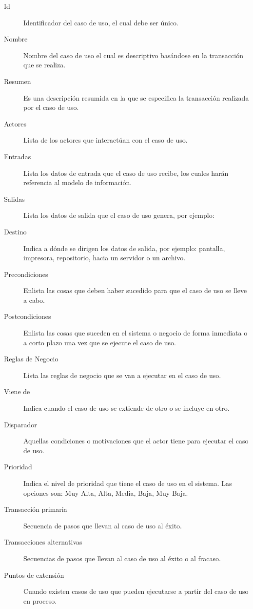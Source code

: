 \begin{description}
	\item[Id] Identificador del caso de uso, el cual debe ser único.
	\item[Nombre] Nombre del caso de uso el cual es descriptivo basándose en la transacción que se realiza.
	\item[Resumen] Es una descripción resumida en la que se especifica la transacción realizada por el caso de uso.
	\item[Actores] Lista de los actores que interactúan con el caso de uso.
	\item[Entradas] Lista los datos de entrada que el caso de uso recibe, los cuales harán referencia al modelo de información.
	\item[Salidas] Lista los datos de salida que el caso de uso genera, por ejemplo: 
	\item[Destino] Indica a dónde se dirigen los datos de salida, por ejemplo: pantalla, impresora, repositorio, hacia un servidor o un archivo.
	\item[Precondiciones] Enlista las cosas que deben haber sucedido para que el caso  de uso se lleve a cabo.
	\item[Postcondiciones] Enlista las cosas que suceden en el sistema o negocio de forma inmediata o a corto plazo una vez que se ejecute el caso de uso.
	\item[Reglas de Negocio] Lista las reglas de negocio que se van a ejecutar en el caso de uso.
	\item[Viene de] Indica cuando el caso de uso se extiende de otro o se incluye en otro.
	\item[Disparador] Aquellas condiciones o motivaciones que el actor tiene para ejecutar el caso de uso.
	\item[Prioridad] Indica el nivel de prioridad que tiene el caso de uso en el sistema. Las opciones son: Muy Alta, Alta, Media, Baja, Muy Baja.
	\item[Transacción primaria] Secuencia de pasos que llevan al caso de uso al éxito.
	\item[Transacciones alternativas] Secuencias de pasos que llevan al caso de uso al éxito o al fracaso.
	\item[Puntos de extensión] Cuando existen casos de uso que pueden ejecutarse a partir del caso de uso en proceso.
\end{description}

